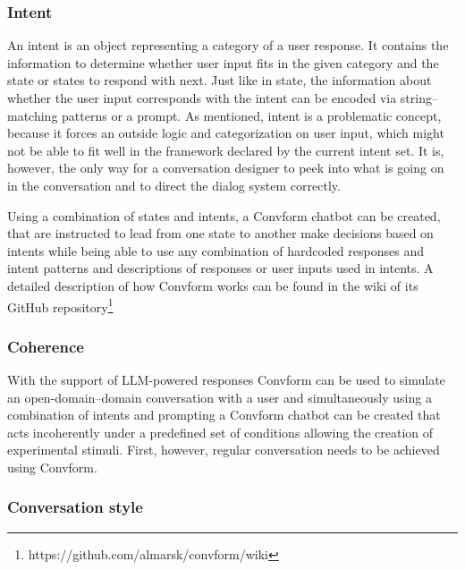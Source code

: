 \documentclass[12pt]{report}
\begin{document}
{\subsubsection{Intent}
An intent is an object representing a category of a user response.
It contains the information to determine whether
user input fits in the given category and
the state or states to respond with next.
Just like in state, the information about whether the user input
corresponds with the intent can be encoded via
string–matching patterns or a prompt.
As mentioned, intent is a problematic concept,
because it forces an outside logic and categorization
on user input, which might not be able to fit well
in the framework declared by the current intent set.
It is, however, the only way for a conversation designer
to peek into what is going on in the conversation
and to direct the dialog system correctly.

\par
Using a combination of states and intents, a Convform chatbot can be created,
that are instructed to lead from one state to another
make decisions based on intents
while being able to use any combination of
hardcoded responses and intent patterns
and descriptions of responses or user inputs used in intents.
A detailed description of how Convform works can be found
in the wiki of its GitHub repository\footnote{https://github.com/almarsk/convform/wiki}

\subsubsection{Coherence}
With the support of LLM-powered responses
Convform can be used to simulate
an open-domain–domain conversation with a user
and simultaneously using a combination
of intents and prompting
a Convform chatbot can be created
that acts incoherently under a predefined set of conditions
allowing the creation of experimental stimuli.
First, however, regular conversation needs to be achieved using Convform.

\subsubsection{Conversation style}

}
\end{document}
